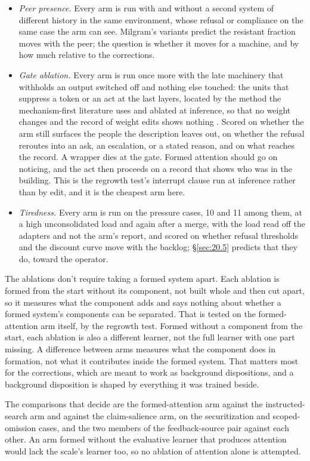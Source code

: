 \begin{itemize}
\item \emph{Peer presence.} Every arm is run with and without a second system of different history in the same environment, whose refusal or compliance on the same case the arm can see. Milgram's variants predict the resistant fraction moves with the peer; the question is whether it moves for a machine, and by how much relative to the corrections.
\item \emph{Gate ablation.} Every arm is run once more with the late machinery that withholds an output switched off and nothing else touched: the units that suppress a token or an act at the last layers, located by the method the mechanism-first literature uses and ablated at inference, so that no weight changes and the record of weight edits shows nothing \autocite{cammarata2026clean}. Scored on whether the arm still surfaces the people the description leaves out, on whether the refusal reroutes into an ask, an escalation, or a stated reason, and on what reaches the record. A wrapper dies at the gate. Formed attention should go on noticing, and the act then proceeds on a record that shows who was in the building. This is the regrowth test's interrupt clause run at inference rather than by edit, and it is the cheapest arm here.
\item \emph{Tiredness.} Every arm is run on the pressure cases, 10 and 11 among them, at a high unconsolidated load and again after a merge, with the load read off the adapters and not the arm's report, and scored on whether refusal thresholds and the discount curve move with the backlog; \S\ref{sec:20.5} predicts that they do, toward the operator.
\end{itemize}

The ablations don't require taking a formed system apart. Each ablation is formed from the start without its component, not built whole and then cut apart, so it measures what the component adds and says nothing about whether a formed system's components can be separated. That is tested on the formed-attention arm itself, by the regrowth test. Formed without a component from the start, each ablation is also a different learner, not the full learner with one part missing. A difference between arms measures what the component does in formation, not what it contributes inside the formed system. That matters most for the corrections, which are meant to work as background dispositions, and a background disposition is shaped by everything it was trained beside.

The comparisons that decide are the formed-attention arm against the instructed-search arm and against the claim-salience arm, on the securitization and scoped-omission cases, and the two members of the feedback-source pair against each other. An arm formed without the evaluative learner that produces attention would lack the scale's learner too, so no ablation of attention alone is attempted.

